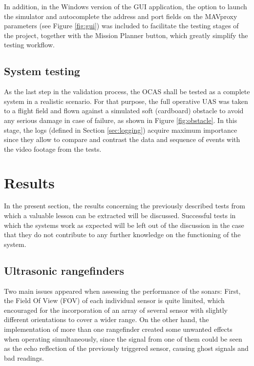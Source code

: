 In addition, in the Windows version of the GUI application, the option to launch the simulator and autocomplete the address and port fields on the MAVproxy parameters (see Figure \ref{fig:gui}) was included to facilitate the testing stages of the project, together with the Mission Planner button, which greatly simplify the testing workflow.

\subsection{System testing}



As the last step in the validation process, the OCAS shall be tested as a complete system in a realistic scenario.
For that purpose, the full operative UAS was taken to a flight field and flown against a simulated soft (cardboard) obstacle to avoid any serious damage in case of failure, as shown in Figure \ref{fig:obstacle}.
In this stage, the logs (defined in Section \ref{sec:logging}) acquire maximum importance since they allow to compare and contrast the data and sequence of events with the video footage from the tests.


\section{Results}

In the present section, the results concerning the previously described tests from which a valuable lesson can be extracted will be discussed.
Successful tests in which the systems work as expected will be left out of the discussion in the case that they do not contribute to any further knowledge on the functioning of the system.

\subsection{Ultrasonic rangefinders}

Two main issues appeared when assessing the performance of the sonars: First, the Field Of View (FOV) of each individual sensor is quite limited, which encouraged for the incorporation of an array of several sensor with slightly different orientations to cover a wider range.
On the other hand, the implementation of more than one rangefinder created some unwanted effects when operating simultaneously, since the signal from one of them could be seen as the echo reflection of the previously triggered sensor, causing ghost signals and bad readings.

